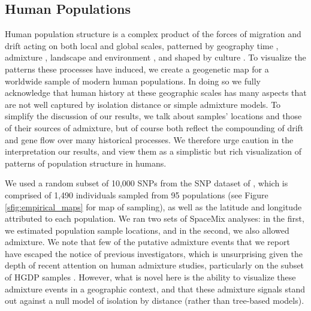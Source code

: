 \documentclass[12pt]{article}
\begin{document}
\subsection*{Human Populations}
Human population structure is a complex product of the forces of migration and drift acting on both local and global scales, patterned by geography \citep{novembre_genes_2008, ralph2013geography} time \citep{skoglund2012origins, skoglund_investigating_2014}, admixture \citep{Hellenthal},  landscape and environment \citep{Beall2010, Bigham2010, Bradburd2013}, and shaped by culture \citep{reich_india_2009, Atzmon2010, moorjani_history_2011}. To visualize the patterns these processes have induced, we create a geogenetic map for a worldwide sample of modern human populations. In doing so we fully acknowledge that human history at these geographic scales has many aspects that are not well captured by isolation distance or simple admixture models. To simplify the discussion of our results, we talk about samples' locations and those of their sources of admixture, but of course both reflect the compounding of drift and gene flow over many historical processes.  We therefore urge caution in the interpretation our results, and view them as a simplistic but rich visualization of patterns of population structure in humans. 

We used a random subset of 10,000 SNPs from the SNP dataset of \citet{Hellenthal}, which is comprised of 1,490 individuals sampled from 95 populations (see Figure  \ref{sfig:empirical_maps} for map of sampling), as well as the latitude and longitude attributed to each population.  
We ran two sets of SpaceMix analyses: in the first, we estimated population sample locations, 
and in the second, we also allowed admixture. 
We note that few of the putative admixture events that we report have escaped the notice of previous investigators, 
which is unsurprising given the depth of recent attention on human admixture studies, particularly on the subset of HGDP samples 
\citep[see ][for various global analyses]{rosenberg_genetic_2002,li_worldwide_2008,Loh:13,patterson_ancient_2012,Hellenthal}. 
However, what is novel here is the ability to visualize these admixture events in a geographic context, 
and that these admixture signals stand out against a null model of isolation by distance (rather than tree-based models).
\end{document}

